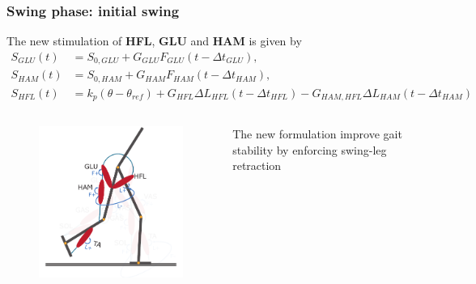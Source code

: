 \documentclass[10pt]{beamer}
\begin{document}
	
	\begin{frame}
		\frametitle{Swing phase: initial swing}
		
		\begin{block}{}
			The new stimulation of \textbf{HFL}, \textbf{GLU} and \textbf{HAM} is given by
			\begin{align*}
				S_{GLU}(t)&=  S_{0,GLU} + G_{GLU}F_{GLU}(t-\Delta t_{GLU}), \\
				S_{HAM}(t)&=  S_{0,HAM} + G_{HAM} F_{HAM} (t-\Delta t_{HAM}), \\
				S_{HFL}(t)&=  k_p (\theta-\theta_{ref}) + G_{HFL}\Delta L_{HFL}(t-\Delta t_{HFL}) - G_{HAM,HFL} \Delta L_{HAM}(t-\Delta t_{HAM})
			\end{align*}
		\end{block}
		
		\begin{columns}
			\begin{column}{.5\textwidth}
				\begin{figure}
					\centering
					\includegraphics[width=.5\textheight]{images/new_model/swing/muscle_initial.pdf}
				\end{figure}
			\end{column}
			\begin{column}{.5\textwidth}
				\begin{exampleblock}{}
					The new formulation improve gait stability by enforcing swing-leg retraction
				\end{exampleblock}
			\end{column}
		\end{columns}	
	\end{frame}
	
\end{document}
